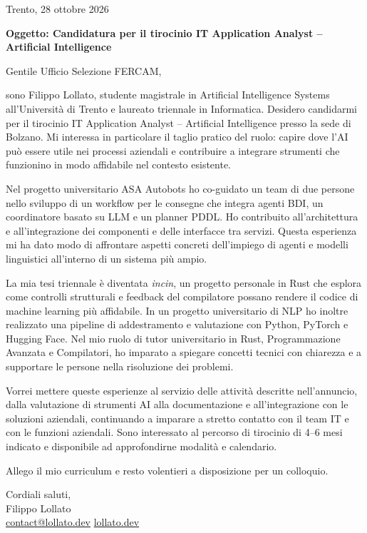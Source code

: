 \documentclass[11pt,a4paper]{article}
\begin{document}
\begin{flushright}
Trento, 28 ottobre 2026
\end{flushright}

\textbf{Oggetto: Candidatura per il tirocinio IT Application Analyst -- Artificial Intelligence}

Gentile Ufficio Selezione FERCAM,

sono Filippo Lollato, studente magistrale in Artificial Intelligence Systems all'Università di Trento e laureato triennale in Informatica. Desidero candidarmi per il tirocinio IT Application Analyst -- Artificial Intelligence presso la sede di Bolzano. Mi interessa in particolare il taglio pratico del ruolo: capire dove l'AI può essere utile nei processi aziendali e contribuire a integrare strumenti che funzionino in modo affidabile nel contesto esistente.

Nel progetto universitario ASA Autobots ho co-guidato un team di due persone nello sviluppo di un workflow per le consegne che integra agenti BDI, un coordinatore basato su LLM e un planner PDDL. Ho contribuito all'architettura e all'integrazione dei componenti e delle interfacce tra servizi. Questa esperienza mi ha dato modo di affrontare aspetti concreti dell'impiego di agenti e modelli linguistici all'interno di un sistema più ampio.

La mia tesi triennale è diventata \textit{incin}, un progetto personale in Rust che esplora come controlli strutturali e feedback del compilatore possano rendere il codice di machine learning più affidabile. In un progetto universitario di NLP ho inoltre realizzato una pipeline di addestramento e valutazione con Python, PyTorch e Hugging Face. Nel mio ruolo di tutor universitario in Rust, Programmazione Avanzata e Compilatori, ho imparato a spiegare concetti tecnici con chiarezza e a supportare le persone nella risoluzione dei problemi.

Vorrei mettere queste esperienze al servizio delle attività descritte nell'annuncio, dalla valutazione di strumenti AI alla documentazione e all'integrazione con le soluzioni aziendali, continuando a imparare a stretto contatto con il team IT e con le funzioni aziendali. Sono interessato al percorso di tirocinio di 4--6 mesi indicato e disponibile ad approfondirne modalità e calendario.

Allego il mio curriculum e resto volentieri a disposizione per un colloquio.

Cordiali saluti,\\
Filippo Lollato\\
\href{mailto:contact@lollato.dev}{contact@lollato.dev} \enskip\textbullet\enskip \href{https://lollato.dev}{lollato.dev}
\end{document}
